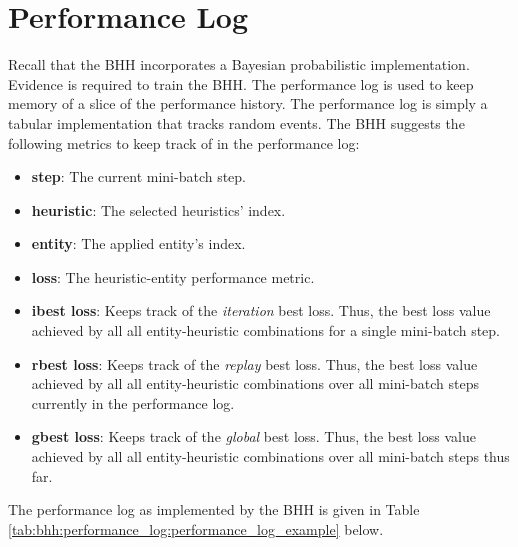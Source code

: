 \section{Performance Log}
\label{sec:bhh:performance_log}

Recall that the \ac{BHH} incorporates a Bayesian probabilistic implementation. Evidence is required to train the \ac{BHH}. The performance log is used to keep memory of a slice of the performance history. The performance log is simply a tabular implementation that tracks random events. The \ac{BHH} suggests the following metrics to keep track of in the performance log:

\begin{itemize}
      \item \textbf{step}: The current mini-batch step.

      \item \textbf{heuristic}: The selected heuristics' index.

      \item \textbf{entity}: The applied entity's index.

      \item \textbf{loss}: The heuristic-entity performance metric.

      \item \textbf{ibest loss}: Keeps track of the \textit{iteration} best loss. Thus, the best loss value achieved by all all entity-heuristic combinations for a single mini-batch step.

      \item \textbf{rbest loss}:  Keeps track of the \textit{replay} best loss. Thus, the best loss value achieved by all all entity-heuristic combinations over all mini-batch steps currently in the performance log.

      \item \textbf{gbest loss}:  Keeps track of the \textit{global} best loss. Thus, the best loss value achieved by all all entity-heuristic combinations over all mini-batch steps thus far.
\end{itemize}

The performance log as implemented by the \ac{BHH} is given in Table \ref{tab:bhh:performance_log:performance_log_example} below.

